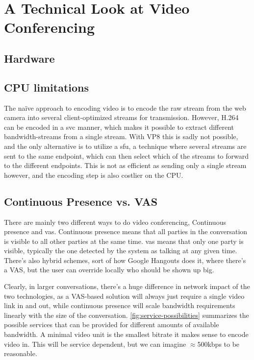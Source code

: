 

\section{A Technical Look at Video Conferencing}

\subsection{Hardware}



\subsection{CPU limitations}

The naïve approach to encoding video is to encode the raw stream from the web camera into several client-optimized streams for transmission. However, H.264 can be encoded in a \gls{svc} manner, which makes it possible to extract different bandwidth-streams from a single stream. With VP8 this is sadly not possible, and the only alternative is to utilize a \gls{sfu}, a technique where several streams are sent to the same endpoint, which can then select which of the streams to forward to the different endpoints. This is not as efficient as sending only a single stream however, and the encoding step is also costlier on the CPU.


\subsection{Continuous Presence vs. VAS}

There are mainly two different ways to do video conferencing, Continuous presence and \acrfull{vas}. Continuous presence means that all parties in the conversation is visible to all other parties at the same time. \gls{vas} means that only one party is visible, typically the one detected by the system as talking at any given time. There's also hybrid schemes, sort of how Google Hangouts does it, where there's a VAS, but the user can override locally who should be shown up big.

Clearly, in larger conversations, there's a huge difference in network impact of the two technologies, as a VAS-based solution will always just require a single video link in and out, while continuous presence will scale bandwidth requirements linearly with the size of the conversation. \autoref{fig:service-possibilities} summarizes the possible services that can be provided for different amounts of available bandwidth. A minimal video unit is the smallest bitrate it makes sense to encode video in. This will be service dependent, but we can imagine $\approx$500kbps to be reasonable.

